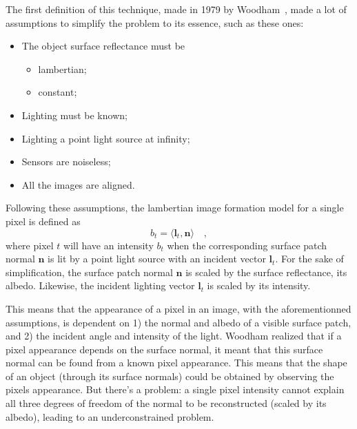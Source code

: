\documentclass{report}
\begin{document}
The first definition of this technique, made in 1979 by Woodham~\cite{Woodham1979}, made a lot of assumptions to simplify the problem to its essence, such as these ones:

\begin{itemize} \setlength\itemsep{-0.2em}
  \item The object surface reflectance must be
  \vspace{-0.65em}\begin{itemize} \setlength\itemsep{0.1em}
    \item lambertian;
    \item constant;
  \end{itemize} \vspace{-0.4em}
  \item Lighting must be known;
  \item Lighting a point light source at infinity;
  \item Sensors are noiseless;
  \item All the images are aligned.
\end{itemize}

Following these assumptions, the lambertian image formation model for a single pixel is defined as
\begin{equation}
b_t =  \langle \mathbf{l}_t , \mathbf{n} \rangle \quad,
\end{equation}
where pixel $t$ will have an intensity $b_t$ when the corresponding surface patch normal $\mathbf{n}$ is lit by a point light source with an incident vector $\mathbf{l}_t$. For the sake of simplification, the surface patch normal $\mathbf{n}$ is scaled by the surface reflectance, its albedo. Likewise, the incident lighting vector $\mathbf{l}_t$ is scaled by its intensity.

This means that the appearance of a pixel in an image, with the aforementionned assumptions, is dependent on 1) the normal and albedo of a visible surface patch, and 2) the incident angle and intensity of the light. Woodham realized that if a pixel appearance depends on the surface normal, it meant that this surface normal can be found from a known pixel appearance. This means that the shape of an object (through its surface normals) could be obtained by observing the pixels appearance. But there's a problem: a single pixel intensity cannot explain all three degrees of freedom of the normal to be reconstructed (scaled by its albedo), leading to an underconstrained problem.
\end{document}
